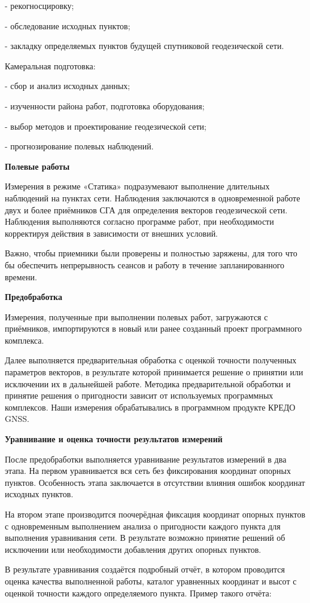 \documentclass[a4paper]{article}
\begin{document}
{\begin{newpage}
\par - рекогносцировку;
\par - обследование исходных пунктов;
\par - закладку определяемых пунктов будущей спутниковой геодезической сети.
\par Камеральная подготовка:
\par - сбор и анализ исходных данных;
\par - изученности района работ, подготовка оборудования;
\par - выбор методов и проектирование геодезической сети;
\par - прогнозирование полевых наблюдений. 
\begin{center}
    \large {\textbf{Полевые работы}}
\end{center}
\par Измерения в режиме «Статика» подразумевают выполнение длительных наблюдений на пунктах сети. Наблюдения заключаются в одновременной работе двух и более приёмников СГА для определения векторов геодезической сети. Наблюдения выполняются согласно программе работ, при необходимости корректируя действия в зависимости от внешних условий.
\par Важно, чтобы приемники были проверены и полностью заряжены, для того что бы обеспечить непрерывность сеансов и работу в течение запланированного времени.
\begin{center}
    \large {\textbf{Предобработка}}
\end{center}
\par Измерения, полученные при выполнении полевых работ, загружаются с приёмников, импортируются в новый или ранее созданный проект программного комплекса.
\par Далее выполняется предварительная обработка с оценкой точности полученных параметров векторов, в результате которой принимается решение о принятии или исключении их в дальнейшей работе. Методика предварительной обработки и принятие решения о пригодности зависит от используемых программных комплексов. Наши измерения обрабатывались в программном продукте КРЕДО GNSS.
\begin{center}
    \large {\textbf{Уравнивание и оценка точности результатов измерений}}
\end{center}
\par После предобработки выполняется уравнивание результатов измерений в два этапа. На первом уравнивается вся сеть без фиксирования координат опорных пунктов. Особенность этапа заключается в отсутствии влияния ошибок координат исходных пунктов.
\par На втором этапе производится поочерёдная фиксация координат опорных пунктов с одновременным выполнением анализа о пригодности каждого пункта для выполнения уравнивания сети. В результате возможно принятие решений об исключении или необходимости добавления других опорных пунктов.
\par В результате уравнивания создаётся подробный отчёт, в котором проводится оценка качества выполненной работы, каталог уравненных координат и высот с оценкой точности каждого определяемого пункта. Пример такого отчёта:
\end{newpage}
}
\end{document}

